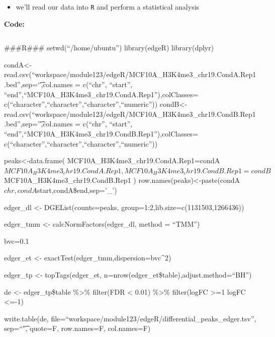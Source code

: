 \documentclass[
]{book}
\providecommand{\tightlist}{%
  \setlength{\itemsep}{0pt}\setlength{\parskip}{0pt}}
\begin{document}
\begin{itemize}
\tightlist
\item
  we'll read our data into \texttt{R} and perform a statistical analysis
\end{itemize}

\textbf{Code:}

\begin{verbatim}
\end{verbatim}

\#\#\#R\#\#\#
setwd(``/home/ubuntu'')
library(edgeR)
library(dplyr)

condA\textless-read.csv(``workspace/module123/edgeR/MCF10A\_H3K4me3\_chr19.CondA.Rep1.bed'',sep=`\t',col.names = c(``chr'', ``start'', ``end'',``MCF10A\_H3K4me3\_chr19.CondA.Rep1''),colClasses= c(``character'',``character'',``character'',``numeric''))
condB\textless-read.csv(``workspace/module123/edgeR/MCF10A\_H3K4me3\_chr19.CondB.Rep1.bed'',sep='\t',col.names = c(``chr'', ``start'', ``end'',``MCF10A\_H3K4me3\_chr19.CondB.Rep1''),colClasses= c(``character'',``character'',``character'',``numeric''))

peaks\textless-data.frame(
MCF10A\_H3K4me3\_chr19.CondA.Rep1=condA\(MCF10A_H3K4me3_chr19.CondA.Rep1,
    MCF10A_H3K4me3_chr19.CondB.Rep1=condB\)MCF10A\_H3K4me3\_chr19.CondB.Rep1
)
row.names(peaks)\textless-paste(condA\(chr,condA\)start,condA\$end,sep='\_')

edger\_dl \textless- DGEList(counts=peaks, group=1:2,lib.size=c(1131503,1266436))

edger\_tmm \textless- calcNormFactors(edger\_dl, method = ``TMM'')

bvc=0.1

edger\_et \textless- exactTest(edger\_tmm,dispersion=bvc\^{}2)

edger\_tp \textless- topTags(edger\_et, n=nrow(edger\_et\$table),adjust.method=``BH'')

de \textless- edger\_tp\$table \%\textgreater\% filter(FDR \textless{} 0.01) \%\textgreater\% filter(logFC \textgreater=1 \textbar{} logFC \textless=-1)

write.table(de, file=``workspace/module123/edgeR/differential\_peaks\_edger.tsv'', sep=``\t", quote=F, row.names=F, col.names=F)
\end{document}
